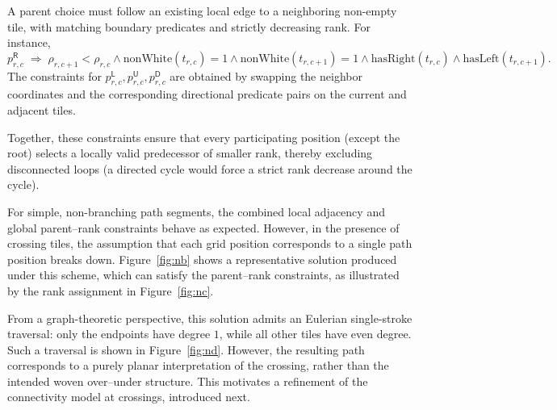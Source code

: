 \documentclass[letterpaper,11pt]{article}
\newcommand{\kind}[1]{\mathsf{#1}}
\begin{document}
A parent choice must follow an existing local edge to a neighboring
non-empty tile, with matching boundary predicates and strictly
decreasing rank. For instance,
\[
p^\kind{R}_{r,c}\;\Rightarrow\; \rho_{r,c+1}<\rho_{r,c} \wedge
\mathrm{nonWhite}(t_{r,c}) = 1 \wedge \mathrm{nonWhite}(t_{r,c+1})=1
\wedge \mathrm{hasRight}(t_{r,c}) \wedge \mathrm{hasLeft}(t_{r,c+1}) .
\]
The constraints for \(p^\kind{L}_{r,c}, p^\kind{U}_{r,c}, p^\kind{D}_{r,c}\) are
obtained by swapping the neighbor coordinates and the corresponding
directional predicate pairs on the current and adjacent tiles.


Together, these constraints ensure that every participating position
(except the root) selects a locally valid predecessor of smaller rank,
thereby excluding disconnected loops (a directed cycle would force a
strict rank decrease around the cycle).

For simple, non-branching path segments, the combined local adjacency
and global parent--rank constraints behave as expected. However, in
the presence of crossing tiles, the assumption that each grid position
corresponds to a single path position breaks down. Figure~\ref{fig:nb}
shows a representative solution produced under this scheme, which can
satisfy the parent--rank constraints, as illustrated by the rank
assignment in Figure~\ref{fig:nc}.

From a graph-theoretic perspective, this solution admits an Eulerian
single-stroke traversal: only the endpoints have degree \(1\), while
all other tiles have even degree. Such a traversal is shown in
Figure~\ref{fig:nd}. However, the resulting path corresponds to a
purely planar interpretation of the crossing, rather than the intended
woven over--under structure. This motivates a refinement of the
connectivity model at crossings, introduced next.
\end{document}
